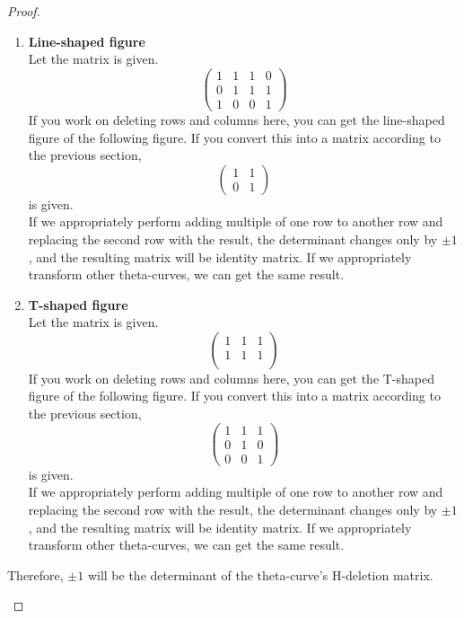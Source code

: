 \documentclass{article}
\theoremstyle{definition}
\theoremstyle{theorem}
\theoremstyle{proposition}
\theoremstyle{corollary}
\begin{document}
\begin{proof}
\begin{enumerate}
\begin{enumerate}[label={(\roman*)}]
    \item \textbf{Line-shaped figure}\\
    Let the matrix is given.
    $$\begin{pmatrix}
        1 & 1 & 1 & 0\\
        0 & 1 & 1 & 1\\
        1 & 0 & 0 & 1
    \end{pmatrix}$$
    If you work on deleting rows and columns here, you can get the line-shaped figure of the following figure. If you convert this into a matrix according to the previous section,
    $$\begin{pmatrix}
        1 & 1 \\
        0 & 1
    \end{pmatrix}$$
    is given.\\
    If we appropriately perform adding multiple of one row to another row and replacing the second row with the result, the determinant changes only by $\pm 1$, and the resulting matrix will be identity matrix. If we appropriately transform other theta-curves, we can get the same result.
    \item \textbf{T-shaped figure}\\
    Let the matrix is given.
    $$\begin{pmatrix}
        1 & 1 & 1\\
        1 & 1 & 1\\
    \end{pmatrix}$$
    If you work on deleting rows and columns here, you can get the T-shaped figure of the following figure. If you convert this into a matrix according to the previous section,
    $$\begin{pmatrix}
        1 & 1 & 1\\
        0 & 1 & 0\\
        0 & 0 & 1
    \end{pmatrix}$$
    is given.\\
    If we appropriately perform adding multiple of one row to another row and replacing the second row with the result, the determinant changes only by $\pm 1$, and the resulting matrix will be identity matrix. If we appropriately transform other theta-curves, we can get the same result.
\end{enumerate}
Therefore, $\pm 1$ will be the determinant of the theta-curve's H-deletion matrix.


\end{enumerate}
\end{proof}
\end{document}
